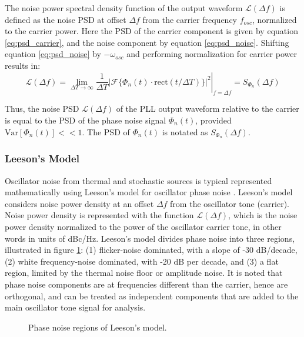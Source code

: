 		 The noise power spectral density function of the output waveform $\mathcal{L}(\Delta f)$ is defined as the noise PSD at offset $\Delta f$ from the carrier frequency $f_{osc}$, normalized to the carrier power. Here the PSD of the carrier component is given by equation \ref{eq:psd_carrier}, and the noise component by equation \ref{eq:psd_noise}. Shifting equation \ref{eq:psd_noise} by $-\omega_{osc}$ and performing normalization for carrier power results in:
		\begin{equation}\label{eq:pn_psd_relation}
			\mathcal{L}(\Delta f) = \left.\lim_{\Delta T\rightarrow\infty}\frac{1}{\Delta T}|\mathcal{F}\{\Phi_{n}(t)\cdot\mathrm{rect}(t/\Delta T)\}|^2 \right|_{f=\Delta f}= S_{\Phi_{n}}(\Delta f)
		\end{equation}

		Thus, the noise PSD $\mathcal{L}(\Delta f)$ of the PLL output waveform relative to the carrier is equal to the PSD of the phase noise signal $\Phi_{n}(t)$, provided $\text{Var}[\Phi_{n}(t)] << 1$. The PSD of $\Phi_{n}(t)$ is notated as $S_{\Phi_{n}}(\Delta f)$.


	\subsubsection{Leeson's Model}\label{dco_noise}
		Oscillator noise from thermal and stochastic sources is typical represented mathematically using Leeson's model for oscillator phase noise \cite{leeson_1966}. Leeson's model considers noise power density at an offset $\Delta f$ from the oscillator tone (carrier). Noise power density is represented with the function $\mathcal{L}(\Delta f)$, which is the noise power density normalized to the power of the oscillator carrier tone, in other words in units of dBc/Hz. Leeson's model divides phase noise into three regions, illustrated in figure \ref{fig:leeson_pn}: (1) flicker-noise dominated, with a slope of -30 dB/decade, (2) white frequency-noise dominated, with -20 dB per decade, and (3) a flat region, limited by the thermal noise floor or amplitude noise. It is noted that phase noise components are at frequencies different than the carrier, hence are orthogonal, and can be treated as independent components that are added to the main oscillator tone signal for analysis. 

			\begin{figure}[htb!]
		        \centering
		        
			    \caption{Phase noise regions of Leeson's model.}
			    \label{fig:leeson_pn}
			\end{figure}

